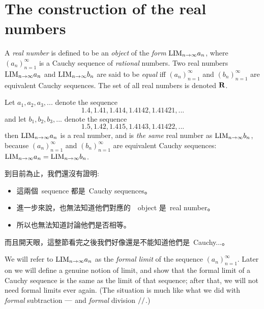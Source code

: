\section{The construction of the real numbers} \label{sec 5.3}

\begin{definition}  \label{def 5.3.1}
A \emph{real number} is defined to be an \emph{object} of the \emph{form} \(\text{LIM}_{n \to \infty} a_n\),
where \((a_n)_{n = 1}^{\infty}\) is a Cauchy sequence of \emph{rational} numbers.
Two real numbers \(\text{LIM}_{n \to \infty} a_n\) and \(\text{LIM}_{n \to \infty} b_n\) are said to be \emph{equal} iff \((a_n)_{n = 1}^{\infty}\) and \((b_n)_{n = 1}^{\infty}\) are equivalent Cauchy sequences.
The set of all real numbers is denoted \(\mathbf{R}\).
\end{definition}

\begin{example} [Informal] \label{example 5.3.2}
Let \(a_1, a_2, a_3, ...\) denote the sequence
\[
    1.4, 1.41, 1.414, 1.4142, 1.41421,...
\]
and let \(b_1, b_2, b_3,...\) denote the sequence
\[
    1.5, 1.42, 1.415, 1.4143, 1.41422,...
\]
then \(\text{LIM}_{n \to \infty} a_n\) is a real number, and is \emph{the same} real number as \(\text{LIM}_{n \to \infty} b_n\),
because \((a_n)_{n = 1}^{\infty}\) and \((b_n)_{n = 1}^{\infty}\) are equivalent Cauchy sequences:
\(\text{LIM}_{n \to \infty} a_n = \text{LIM}_{n \to \infty} b_n\).
\end{example}
\begin{note}
到目前為止，我們還沒有證明:
\begin{itemize}
    \item 這兩個\ sequence 都是\ Cauchy sequences。
    \item 進一步來說，也無法知道他們對應的\ \LIM\ object 是\ real number。
    \item 所以也無法知道討論他們是否相等。
\end{itemize}
而且開天眼，這整節看完之後我們好像還是不能知道他們是\ Cauchy...。
\end{note}

\begin{note}
We will refer to \(\text{LIM}_{n \to \infty} a_n\) as the \emph{formal limit} of the sequence \((a_n)_{n = 1}^{\infty}\).
Later on we will define a genuine notion of limit, and show that the formal limit of a Cauchy sequence is the same as the limit of that sequence;
after that, we will not need formal limits ever again.
(The situation is much like what we did with \emph{formal} subtraction \(\text{---}\) and \emph{formal} division \(\text{//}\).)
\end{note}

